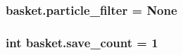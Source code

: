 \subsubsection[{particle\+\_\+filter}]{\setlength{\rightskip}{0pt plus 5cm}basket.\+particle\+\_\+filter = None}\label{namespacebasket_ae8e523df739d65470eb5eba16867f329}
\subsubsection[{save\+\_\+count}]{\setlength{\rightskip}{0pt plus 5cm}int basket.\+save\+\_\+count = 1}\label{namespacebasket_a3d020674941ec4faf6734391ca082c40}
